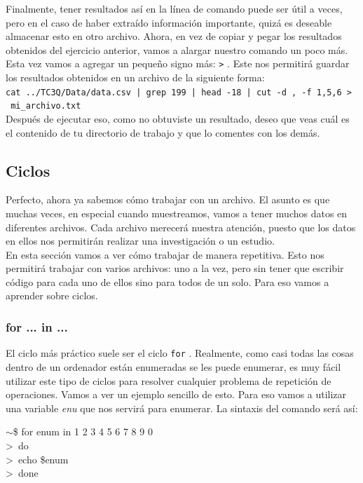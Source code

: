 \documentclass[10pt,letterpaper]{article}
\newcommand{\inlinecode}[1]{
\colorbox{light-gray}{\texttt{#1}}
}
\newenvironment{Code}
{
\begin{lrbox}{\selvestebox}%
\begin{minipage}{\dimexpr\columnwidth-2\fboxsep\relax}
\fontfamily{\ttdefault}\selectfont
}
{\end{minipage}\end{lrbox}%
\begin{center}
\colorbox{light-gray}{\usebox{\selvestebox}}
\end{center}
}
\begin{document}
Finalmente, tener resultados as\'i en la l\'inea de comando puede ser \'util a veces, pero en el caso de haber extra\'ido informaci\'on importante, quiz\'a es deseable almacenar esto en otro archivo. Ahora, en vez de copiar y pegar los resultados obtenidos del ejercicio anterior, vamos a alargar nuestro comando un poco m\'as. Esta vez vamos a agregar un peque\~no signo m\'as: \inlinecode{>}. Este nos permitir\'a guardar los resultados obtenidos en un archivo de la siguiente forma:\\
\inlinecode{cat ../TC3Q/Data/data.csv | grep 199 | head -18 | cut -d , -f 1,5,6 > \ mi\_archivo.txt}\\
Despu\'es de ejecutar eso, como no obtuviste un resultado, deseo que veas cu\'al es el contenido de tu directorio de trabajo y que lo comentes con los dem\'as.

\subsection{Ciclos}
Perfecto, ahora ya sabemos c\'omo trabajar con un archivo. El asunto es que muchas veces, en especial cuando muestreamos, vamos a tener muchos datos en diferentes archivos. Cada archivo merecer\'a nuestra atenci\'on, puesto que los datos en ellos nos permitir\'an realizar una investigaci\'on o un estudio.\\

En esta secci\'on vamos a ver c\'omo trabajar de manera repetitiva. Esto nos permitir\'a trabajar con varios archivos: uno a la vez, pero sin tener que escribir c\'odigo para cada uno de ellos sino para todos de un solo. Para eso vamos a aprender sobre ciclos.

\subsubsection{for ... in ...}
El ciclo m\'as pr\'actico suele ser el ciclo \inlinecode{for}. Realmente, como casi todas las cosas dentro de un ordenador est\'an enumeradas se les puede enumerar, es muy f\'acil utilizar este tipo de ciclos para resolver cualquier problema de repetici\'on de operaciones. Vamos a ver un ejemplo sencillo de esto. Para eso vamos a utilizar una variable \emph{enu} que nos servir\'a para enumerar. La sintaxis del comando ser\'a as\'i:
\begin{Code}
$\sim$\$ for enum in 1 2 3 4 5 6 7 8 9 0\\
>\ do\\
>\ echo \$enum\\
>\ done
\end{Code}
\end{document}
